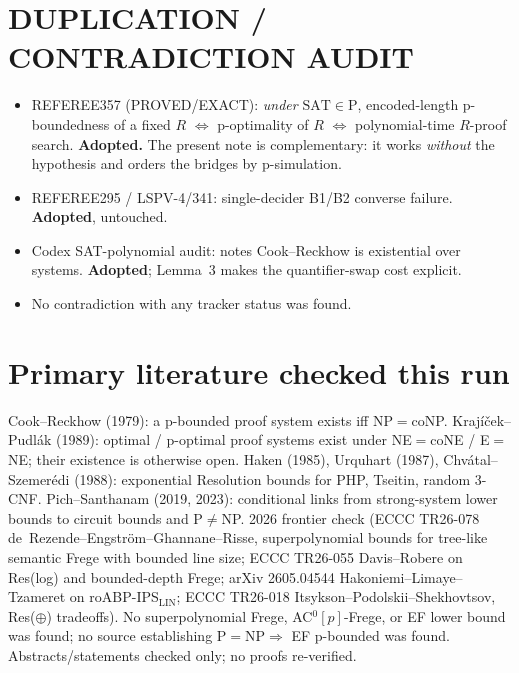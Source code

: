 \documentclass[11pt]{article}
\newcommand{\SAT}{\mathrm{SAT}}
\begin{document}
\section*{DUPLICATION / CONTRADICTION AUDIT}
\begin{itemize}
\item REFEREE357 (PROVED/EXACT): \emph{under} $\SAT\in\mathrm P$, encoded-length
p-boundedness of a fixed $R$ $\iff$ p-optimality of $R$ $\iff$ polynomial-time
$R$-proof search. \textbf{Adopted.} The present note is complementary: it
works \emph{without} the hypothesis and orders the bridges by p-simulation.
\item REFEREE295 / LSPV-4/341: single-decider B1/B2 converse failure.
\textbf{Adopted}, untouched.
\item Codex SAT-polynomial audit: notes Cook--Reckhow is existential over
systems. \textbf{Adopted}; Lemma~3 makes the quantifier-swap cost explicit.
\item No contradiction with any tracker status was found.
\end{itemize}

\section*{Primary literature checked this run}
Cook--Reckhow (1979): a p-bounded proof system exists iff NP$=$coNP.
Krajíček--Pudlák (1989): optimal / p-optimal proof systems exist under
NE$=$coNE / E$=$NE; their existence is otherwise open. Haken (1985),
Urquhart (1987), Chvátal--Szemerédi (1988): exponential Resolution bounds
for PHP, Tseitin, random 3-CNF. Pich--Santhanam (2019, 2023): conditional
links from strong-system lower bounds to circuit bounds and P$\neq$NP.
2026 frontier check (ECCC TR26-078 de~Rezende--Engström--Ghannane--Risse,
superpolynomial bounds for tree-like semantic Frege with bounded line size;
ECCC TR26-055 Davis--Robere on Res(log) and bounded-depth Frege; arXiv
2605.04544 Hakoniemi--Limaye--Tzameret on roABP-IPS$_{\mathrm{LIN}}$;
ECCC TR26-018 Itsykson--Podolskii--Shekhovtsov, Res($\oplus$) tradeoffs).
No superpolynomial Frege, AC$^0[p]$-Frege, or EF lower bound was found; no
source establishing $\mathrm P=\mathrm{NP}\Rightarrow$ EF p-bounded was found.
Abstracts/statements checked only; no proofs re-verified.
\end{document}

